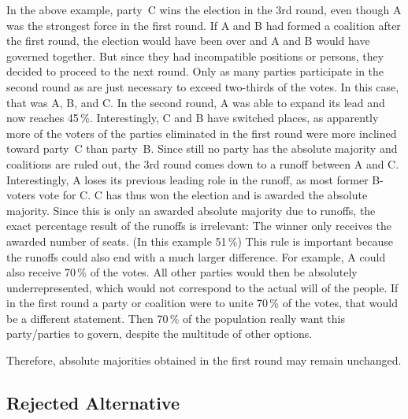 \bigskip

In the above example, party~C wins the election in the 3rd round, even though A was the
strongest force in the first round. If A and B had formed a coalition after the first round,
the election would have been over and A and B would have governed together. But since they had incompatible
positions or persons, they decided to proceed to the next round.
Only as many parties participate in the second round as are just necessary to exceed two-thirds
of the votes. In this case, that was A, B, and C. In the second round, A
was able to expand its lead and now reaches 45\,\%. Interestingly, C and B have
switched places, as apparently more of the voters of the parties eliminated in the first round
were more inclined toward party~C than party~B.
Since still no party has the absolute majority and coalitions are ruled out,
the 3rd round comes down to a runoff between A and C. Interestingly, A loses its
previous leading role in the runoff, as most former B-voters vote for C. C has
thus won the election and is awarded the absolute majority. Since this is only an
awarded absolute majority due to runoffs, the exact percentage
result of the runoffs is irrelevant: The winner only receives the awarded number of seats. (In
this example 51\,\%) This rule is important because the runoffs could also end with
a much larger difference. For example, A could also receive 70\,\% of the votes.
All other parties would then be absolutely underrepresented, which would not correspond to the actual
will of the people. If in the first round a party or coalition were to unite 70\,\% of the votes,
that would be a different statement. Then 70\,\% of the population really want
this party/parties to govern, despite the multitude of other options.

Therefore, absolute majorities obtained in the first round may remain unchanged.

\subsection{Rejected Alternative}

